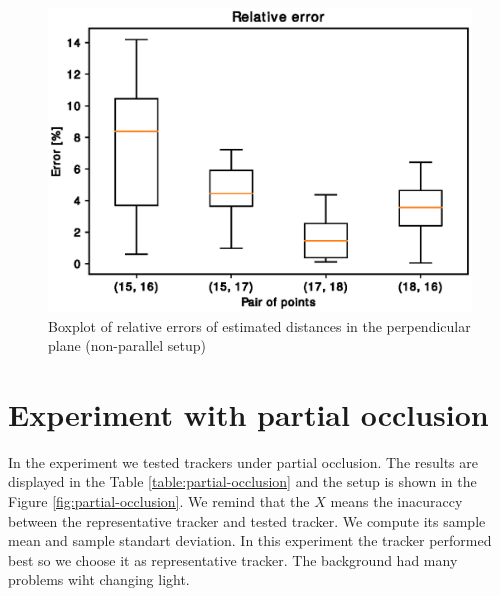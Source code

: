 \begin{figure}
\includegraphics[width=\linewidth]{experiments/63/table1.eps}
\caption{Boxplot of relative errors of estimated distances in the perpendicular plane (non-parallel setup)}
\label{table:63table}
\end{figure}

\section{Experiment with partial occlusion}

In the experiment we tested trackers under partial occlusion. The results are
displayed in the Table \ref{table:partial-occlusion} and the setup is shown in
the Figure \ref{fig:partial-occlusion}. We remind that the $X$ means the
inacuraccy between the representative tracker and tested tracker. We compute
its sample mean and sample standart deviation. In this experiment the \hsv{}
tracker performed best so we choose it as representative tracker. The
\simback{} background had many problems wiht changing light.

